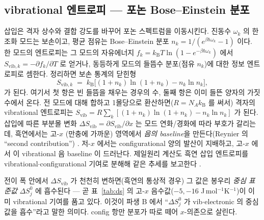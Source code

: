 \documentclass[11pt,a4paper]{article}
\newcommand{\vib}{\mathrm{vib}}
\newcommand{\kB}{k_{\mathrm B}}
\begin{document}
\subsection{vibrational 엔트로피 — 포논 Bose--Einstein 분포}
삽입은 격자 상수와 결합 강도를 바꾸어 포논 스펙트럼을 이동시킨다. 진동수 $\omega_k$ 의 한 조화 모드는 보손이고,
평균 점유는 Bose--Einstein 분포 $n_k=1/(e^{\beta\hbar\omega_k}-1)$ 이다. 한 모드의 엔트로피는 그 모드의 자유에너지
$f_k=\kB T\ln(1-e^{-\beta\hbar\omega_k})$ 에서 $S_{\vib,k}=-\partial f_k/\partial T$ 로 얻거나, 동등하게 모드의 들뜸수
분포(점유 $n_k$)에 대한 정보 엔트로피로 셈한다. 정리하면 보손 통계의 닫힌형
\begin{equation}
S_{\vib,k} \;=\; \kB\bigl[(1+n_k)\ln(1+n_k) - n_k\ln n_k\bigr],
\label{eq:Svib_mode}
\end{equation}
가 된다. 여기서 첫 항은 빈 들뜸을 채우는 경우의 수, 둘째 항은 이미 들뜬 양자의 가짓수에서 온다. 전 모드에 대해
합하고 1몰당으로 환산하면($R=N_A\kB$ 를 써서) 격자의 vibrational 엔트로피는
$S_\vib=R\sum_k[(1+n_k)\ln(1+n_k)-n_k\ln n_k]$ 가 된다. 삽입에 따른 부분몰
변화 $\Delta S_\vib=\partial S_\vib/\partial x$ 는 모드 연화/경화에 따라 부호가 갈리는데, 흑연에서는 고-$x$
(만충에 가까운) 영역에서 \emph{음의 baseline}을 만든다(Reynier 의 ``second contribution'') \cite{reynier2003}.
저-$x$ 에서는 configurational 양의 발산이 지배하고, 고-$x$ 에서 이 vibrational 음 baseline 이 드러난다. 제일원리
계산도 흑연 삽입 엔트로피를 vibrational$\cdot$configurational 기여로 분해해 같은 추세를 보고한다 \cite{jpcc2021}.

전이 폭 안에서 $\Delta S_\vib$ 가 천천히 변하면(흑연의 통상적 경우) 그 값은 봉우리 \emph{중심 표준값}
$\Delta S^0_j$ 에 흡수된다 — 곧 표~\ref{tab:ds} 의 고-$x$ 음수값($-5,-16$ J\,mol$^{-1}$K$^{-1}$)이 이미
vibrational 기여를 품고 있다. 이것이 파생 B 에서 ``$\Delta S^0_j$ 가 vib$\cdot$electronic 의 중심값을 흡수''라고
말한 의미다. config 항만 분포가 따로 떼어 $x$-의존으로 살린다.
\end{document}
